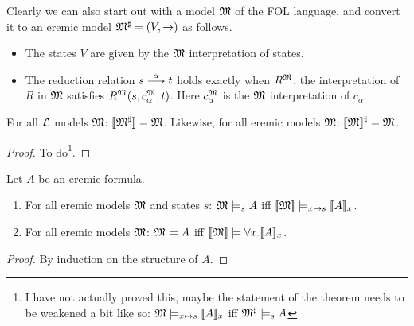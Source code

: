 Clearly we can also start out with a model $\frak{M}$ of the FOL language,
and convert it to an eremic model $\frak{M}^{\sharp} = (V, \rightarrow)$ as
follows.

\begin{itemize}

\item The states $V$ are given by the $\frak{M}$ interpretation of states.

\item The reduction relation $s \stackrel{\alpha}{\longrightarrow} t$ holds exactly when
  $R^{\frak{M}}$, the interpretation of $R$ in $\frak{M}$ satisfies
  $R^{\frak{M}}(s, c^{\frak{M}}_{\alpha}, t)$. Here $c^{\frak{M}}_{\alpha}$ is the
  $\frak{M}$ interpretation of $c_{\alpha}$.

\end{itemize}

\begin{lemma}\label{modelIso:lemma}
For all $\mathcal{L}$ models $\frak{M}$: $\lbrack\!\lbrack \frak{M}^{\sharp} \rbrack\!\rbrack = \frak{M}$.
Likewise, for all eremic models $\frak{M}$: 
 $\lbrack\!\lbrack \frak{M} \rbrack\!\rbrack^{\sharp} = \frak{M}$.
\end{lemma}
\begin{proof}
To do\footnote{I have not actually proved this, maybe the statement of
  the theorem needs to be weakened a bit like so: $\frak{M} \models_{x
    \mapsto s} \lbrack\!\lbrack A \rbrack\!\rbrack_x$ iff $\frak{M}^{\sharp} \models_s A$}.
\end{proof}

\begin{theorem}
Let $A$ be an eremic formula.
\begin{enumerate}

\item For all eremic models $\frak{M}$ and states $s$: $\frak{M} \models_s A$
  iff $\lbrack\!\lbrack \frak{M} \rbrack\!\rbrack \models_{x \mapsto s} \lbrack\!\lbrack A \rbrack\!\rbrack_x$.

\item For all eremic models $\frak{M}$: $\frak{M} \models A$ iff $\lbrack\!\lbrack \frak{M} \rbrack\!\rbrack
  \models \forall x.\lbrack\!\lbrack A \rbrack\!\rbrack_x$.

\end{enumerate}
\end{theorem}
\begin{proof}
By induction on the structure of $A$.
\end{proof}



